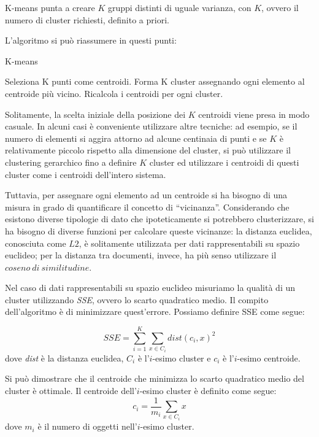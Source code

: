 K-means punta a creare $K$ gruppi distinti di uguale varianza, con $K$, ovvero il numero di cluster richiesti, definito a priori.

L'algoritmo si può riassumere in questi punti:
\begin{algorithm}
	\begin{algorithmic}[1]
  		\caption{K-means}
		\State Seleziona K punti come centroidi.
		\Repeat
			\State Forma K cluster assegnando ogni elemento al centroide più vicino.
			\State Ricalcola i centroidi per ogni cluster.
  	\end{algorithmic}
\end{algorithm}

Solitamente, la scelta iniziale della posizione dei $K$ centroidi viene presa in modo casuale. In alcuni casi è conveniente utilizzare altre tecniche: ad esempio, se il numero di elementi si aggira attorno ad alcune centinaia di punti e se $K$ è relativamente piccolo rispetto alla dimensione del cluster, si può utilizzare il clustering gerarchico fino a definire $K$ cluster ed utilizzare i centroidi di questi cluster come i centroidi dell'intero sistema.

Tuttavia, per assegnare ogni elemento ad un centroide si ha bisogno di una misura in grado di quantificare il concetto di ``vicinanza''. Considerando che esistono diverse tipologie di dato che ipoteticamente si potrebbero clusterizzare, si ha bisogno di diverse funzioni per calcolare queste vicinanze: la distanza euclidea, conosciuta come $L2$, è solitamente utilizzata per dati rappresentabili su spazio euclideo; per la distanza tra documenti, invece, ha più senso utilizzare il $coseno\ di\ similitudine$.

Nel caso di dati rappresentabili su spazio euclideo misuriamo la qualità di un cluster utilizzando \emph{SSE}, ovvero lo scarto quadratico medio. Il compito dell'algoritmo è di minimizzare quest'errore. Possiamo definire SSE come segue:

\begin{equation*}
	SSE = \sum_{i=1}^{K}{\sum_{x \in C_i} {dist(c_i, x)^2}}
\end{equation*}
dove \emph{dist} è la distanza euclidea, $C_i$ è l'$i$-esimo cluster e $c_i$ è l'$i$-esimo centroide.

Si può dimostrare che il centroide che minimizza lo scarto quadratico medio del cluster è ottimale. Il centroide dell'$i$-esimo cluster è definito come segue:
\begin{equation*}
	c_i = \frac{1}{m_i} \sum_{x \in C_i}{x}
\end{equation*}
dove $m_i$ è il numero di oggetti nell'$i$-esimo cluster.

